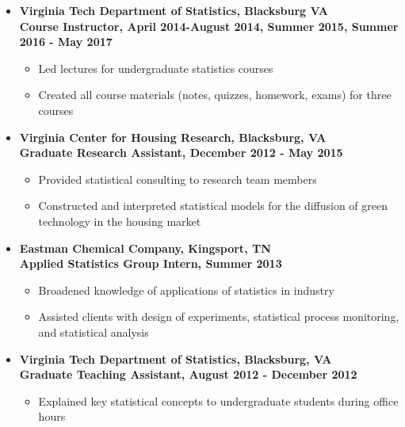 \documentclass[10pt]{article}
\begin{document}
\begin{itemize}
\item[] \textbf{Virginia Tech Department of Statistics, Blacksburg VA\\
Course Instructor, April 2014-August 2014, Summer 2015, Summer 2016 - May 2017}
\begin{itemize}
\item Led lectures for undergraduate statistics courses
\item Created all course materials (notes, quizzes, homework, exams) for three courses
\end{itemize} 
 
 
\item[] \textbf{Virginia Center for Housing Research, Blacksburg, VA\\
Graduate Research Assistant, December 2012 - May 2015}
\begin{itemize} 
\item Provided statistical consulting to research team members
\item Constructed and interpreted statistical models for the diffusion of green technology in the housing market
\end{itemize} 

\item[] \textbf{Eastman Chemical Company, Kingsport, TN\\
Applied Statistics Group Intern, Summer 2013}
\begin{itemize}
\item Broadened knowledge of applications of statistics in industry
\item Assisted clients with design of experiments, statistical process monitoring, and statistical analysis
\end{itemize} 


\item[] \textbf{Virginia Tech Department of Statistics, Blacksburg, VA\\
Graduate Teaching Assistant, August 2012 - December 2012}
\begin{itemize}
\item Explained key statistical concepts to undergraduate students during office hours
\end{itemize}


\end{itemize}
\end{document}
